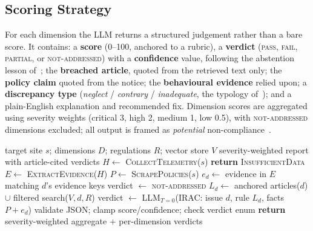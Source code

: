 \documentclass[conference]{IEEEtran}
\begin{document}
\subsection{Scoring Strategy}
For each dimension the LLM returns a structured judgement rather than a bare score. It contains: a \textbf{score} (0--100, anchored to a rubric), a \textbf{verdict} (\textsc{pass}, \textsc{fail}, \textsc{partial}, or \textsc{not-addressed}) with a \textbf{confidence} value, following the abstention lesson of~\cite{ravichander-2019-privacyqa}; the \textbf{breached article}, quoted from the retrieved text only; the \textbf{policy claim} quoted from the notice; the \textbf{behavioural evidence} relied upon; a \textbf{discrepancy type} (\emph{neglect} / \emph{contrary} / \emph{inadequate}, the typology of~\cite{xiao-2023-lalaine}); and a plain-English explanation and recommended fix. Dimension scores are aggregated using severity weights (critical 3, high 2, medium 1, low 0.5), with \textsc{not-addressed} dimensions excluded; all output is framed as \emph{potential} non-compliance~\cite{zimmeck-2019-maps}.

\begin{algorithm}[!t]
\caption{Per-dimension RAG compliance scoring}
\label{alg:scoring}
\begin{algorithmic}[1]
\Require target site $s$; dimensions $D$; regulations $R$; vector store $V$
\Ensure severity-weighted report with article-cited verdicts
\State $H \leftarrow$ \textsc{CollectTelemetry}($s$) 
    \State \textbf{return} \textsc{InsufficientData} 
\EndIf
\State $E \leftarrow$ \textsc{ExtractEvidence}($H$) 
\State $P \leftarrow$ \textsc{ScrapePolicies}($s$)
    \State $e_d \leftarrow$ evidence in $E$ matching $d$'s evidence keys
        \State verdict $\leftarrow$ \textsc{not-addressed} 
    \Else
        \State $L_d \leftarrow$ anchored articles($d$) $\cup$ filtered search($V, d, R$)
        \State verdict $\leftarrow$ \textsc{LLM}$_{T=0}$(IRAC: issue $d$, rule $L_d$, facts $P + e_d$)
        \State validate JSON; clamp score/confidence; check verdict enum
    \EndIf
\EndFor
\State \textbf{return} severity-weighted aggregate + per-dimension verdicts
\end{algorithmic}
\end{algorithm}
\end{document}
